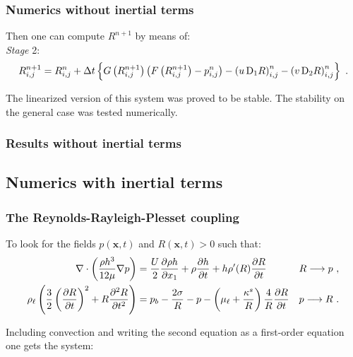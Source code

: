\documentclass[10pt,aspectratio=169]{beamer}
\begin{document}

\begin{frame}\frametitle{Numerics without inertial terms}
Then one can compute $R^{n+1}$ by means of:\\
\bigskip
\emph{Stage} 2:
\begin{equation}
R_{i,j}^{n+1}=R_{i,j}^{n}+\Delta t \left\{G\left(R_{i,j}^{n+1}\right)\left(F\left(R_{i,j}^{n+1}\right)-p^{n}_{i,j}\right)-\left(u\,\textnormal{D}_1R\right)^{n}_{i,j}-\left(v\,\textnormal{D}_2R\right)^{n}_{i,j}\right\}~.\label{eq:ch6:rp-discrete}
\end{equation}

The linearized version of this system was proved to be stable. The stability on the general case was tested numerically.

\end{frame}


\begin{frame}\frametitle{Results without inertial terms}\vspace*{0.5cm}
\begin{center}
	\begin{minipage}{0.9\textwidth}
		\centering 
	\end{minipage}
\end{center}

\end{frame}

\subsection{Numerics with inertial terms}
\setcounter{showSlideNumbers}{0}
\begin{frame}[noframenumbering]
\tableofcontents[
currentsection,
currentsubsection,
subsectionstyle=show/shaded/hide
]
\end{frame}
\setcounter{showSlideNumbers}{1}

\begin{frame}
\frametitle{The Reynolds-Rayleigh-Plesset coupling}

To look for the fields $p(\mathbf{x},t)$ and $R(\mathbf{x},t)>0$ such that:
\begin{align*}
\nabla\cdot\left(\frac{\rho h^3}{12\mu }\nabla p \right)&=\frac{U}{2}\frac{\partial \rho h}{\partial x_1}+\rho \frac{\partial h}{\partial t}+h \rho'(R)\frac{\partial R}{\partial t}&&R \longrightarrow p~,\\
\rho_\ell\left(\frac{3}{2}\left(\frac{\partial R}{\partial t}\right)^2+R\frac{\partial^2 R}{\partial t^2}\right)&=p_b-\frac{2\sigma}{R}-p-\left(\mu_\ell+\frac{\kappa^s}{R}\right)\frac{4}{R}\frac{\partial R}{\partial t}&&p\longrightarrow R~.
\end{align*}

Including convection and writing the second equation as a first-order equation one gets the system:
\end{frame}  
\end{document}
